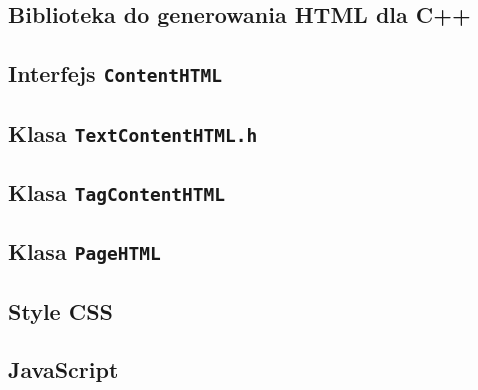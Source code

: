 \documentclass[printmode,oneside]{mgr}
\begin{document}
\newpage
\clearpage %
\begin{appendices}
\chapter{Biblioteka do generowania HTML dla C++ \label{ch_code_snippets}}
%
\section{Interfejs \texttt{ContentHTML}}

%
\section{Klasa \texttt{TextContentHTML.h}}


%
\section{Klasa \texttt{TagContentHTML}}


%
\section{Klasa \texttt{PageHTML}}


%
\section{Style CSS}

\section{JavaScript}

\end{appendices}
\clearpage
\listoffigures
\clearpage
\listoftables
\end{document}
